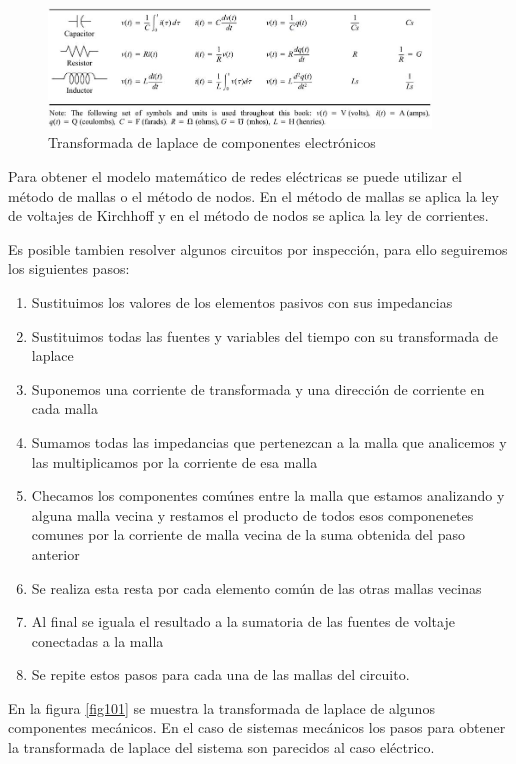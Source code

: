 \documentclass[12pt]{book}
\theoremstyle{definition}
\theoremstyle{remark}
\theoremstyle{plain}
\begin{document}
\begin{figure}
\centering
\includegraphics[width=4in]{circuitos.jpg}
\caption{Transformada de laplace de componentes electrónicos}
\label{fig100}
\end{figure}

Para obtener el modelo matemático de redes eléctricas se puede utilizar el método de mallas o el método de nodos. En el método de mallas se aplica la ley de voltajes de Kirchhoff y en el método de nodos se aplica la ley de corrientes.

Es posible tambien resolver algunos circuitos por inspección, para ello seguiremos los siguientes pasos:

\begin{enumerate}
\item Sustituimos los valores de los elementos pasivos con sus impedancias
\item Sustituimos todas las fuentes y variables del tiempo con su transformada de laplace
\item Suponemos una corriente de transformada y una dirección de corriente en cada malla
\item Sumamos todas las impedancias que pertenezcan a la malla que analicemos y las multiplicamos por la corriente de esa malla
\item Checamos los componentes comúnes entre la malla que estamos analizando y alguna malla vecina y restamos el producto de todos esos componenetes comunes por la corriente de malla vecina de la suma obtenida del paso anterior
\item Se realiza esta resta por cada elemento común de las otras mallas vecinas
\item Al final se iguala el resultado a la sumatoria de las  fuentes de voltaje conectadas a la malla
\item Se repite estos pasos para cada una de las mallas del circuito.
\end{enumerate}

En la figura \ref{fig101} se muestra la transformada de laplace de algunos componentes mecánicos. En el caso de sistemas mecánicos los pasos para obtener la transformada de laplace del sistema son parecidos al caso eléctrico.
\end{document}
